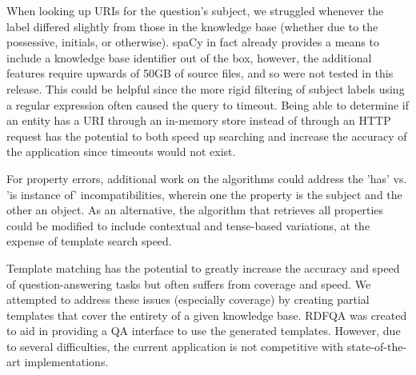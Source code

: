 \documentclass[sigplan,screen]{acmart}
\begin{document}
When looking up URIs for the question's subject, we struggled whenever the label differed slightly from those in the knowledge base (whether due to the possessive, initials, or otherwise). spaCy in fact already provides a means to include a knowledge base identifier out of the box, however, the additional features require upwards of 50GB of source files, and so were not tested in this release. This could be helpful since the more rigid filtering of subject labels using a regular expression often caused the query to timeout. Being able to determine if an entity has a URI through an in-memory store instead of through an HTTP request has the potential to both speed up searching and increase the accuracy of the application since timeouts would not exist.

For property errors, additional work on the algorithms could address the 'has' vs. 'is instance of' incompatibilities, wherein one the property is the subject and the other an object. As an alternative, the algorithm that retrieves all properties could be modified to include contextual and tense-based variations, at the expense of template search speed.

Template matching has the potential to greatly increase the accuracy and speed of question-answering tasks but often suffers from coverage and speed. We attempted to address these issues (especially coverage) by creating partial templates that cover the entirety of a given knowledge base. RDFQA was created to aid in providing a QA interface to use the generated templates. However, due to several difficulties, the current application is not competitive with state-of-the-art implementations.

\nocite{*}


\end{document}
